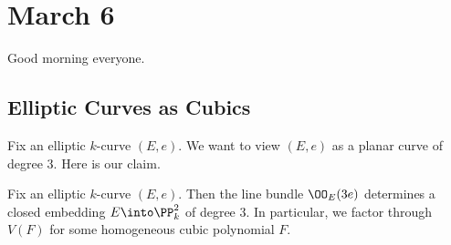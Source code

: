 \documentclass[../notes.tex]{subfiles}
\begin{document}
\section{March 6}

Good morning everyone.

\subsection{Elliptic Curves as Cubics}
Fix an elliptic $k$-curve $(E,e)$. We want to view $(E,e)$ as a planar curve of degree $3$. Here is our claim.
\begin{proposition}
	Fix an elliptic $k$-curve $(E,e)$. Then the line bundle $\OO_E(3e)$ determines a closed embedding $E\into\PP^2_k$ of degree $3$. In particular, we factor through $V(F)$ for some homogeneous cubic polynomial $F$.
\end{proposition}
\end{document}
